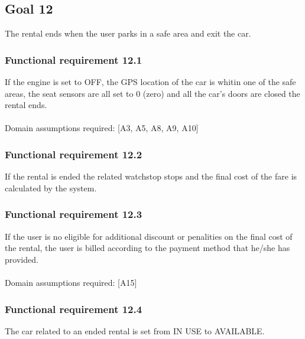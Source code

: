 \subsection{Goal 12}
The rental ends when the user parks in a safe area and exit the car.

\setcounter{secnumdepth}{3}
\subsubsection{Functional requirement 12.1}
If the engine is set to OFF, the GPS location of the car is whitin one of the safe areas, the seat sensors are all set to 0 (zero) and all the car's doors are closed the rental ends.\\~\\
\noindent Domain assumptions required: [A3, A5, A8, A9, A10]

\subsubsection{Functional requirement 12.2}
If the rental is ended the related watchstop stops and the final cost of the fare is calculated by the system.

\subsubsection{Functional requirement 12.3}
If the user is no eligible for additional discount or penalities on the final cost of the rental, the user is billed according to the payment method that he/she has provided.\\~\\
\noindent Domain assumptions required: [A15]

\subsubsection{Functional requirement 12.4}
The car related to an ended rental is set from IN USE to AVAILABLE.
